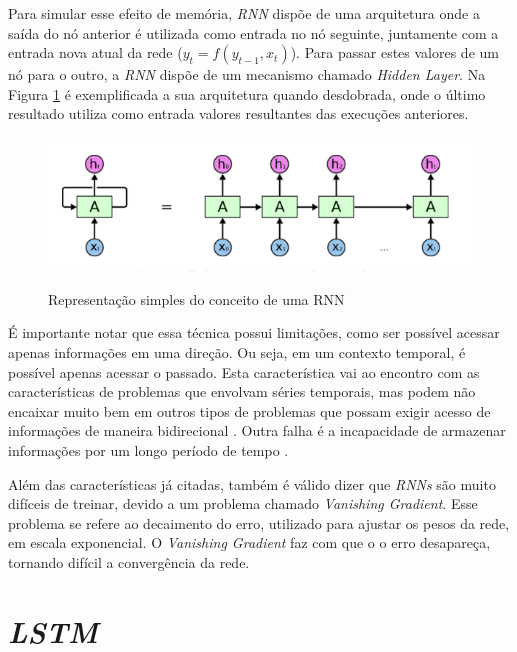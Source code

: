 Para simular esse efeito de memória, \textit{\acrshort{RNN}} dispõe de uma arquitetura onde a saída do nó anterior é utilizada como entrada no nó seguinte, juntamente com a entrada nova atual da rede (\(y_t = f(y_{t-1}, x_t)\)). Para passar estes valores de um nó para o outro, a \textit{\acrshort{RNN}} dispõe de um mecanismo chamado \textit{Hidden Layer}. Na Figura \ref{figure:rnn} é exemplificada a sua arquitetura quando desdobrada, onde o último resultado utiliza como entrada valores resultantes das execuções anteriores.

\begin{figure}[htbp]
    \centering
    \includegraphics[scale=0.4]{monography/img/models/rnnExample.png}
    \label{figure:rnn}
    \caption[Representação simples do conceito de um RNN]{Representação simples do conceito de uma RNN \footnotemark}
\end{figure}

É importante notar que essa técnica possui limitações, como ser possível acessar apenas informações em uma direção. Ou seja, em um contexto temporal, é possível apenas acessar o passado. Esta característica vai ao encontro com as características de problemas que envolvam séries temporais, mas podem não encaixar muito bem em outros tipos de problemas que possam exigir acesso de informações de maneira bidirecional \cite{alex2012}. Outra falha é a incapacidade de armazenar informações por um longo período de tempo \cite{hochreiter2001gradient}. 

Além das características já citadas, também é válido dizer que \textit{\acrshort{RNN}s} são muito difíceis de treinar, devido a um problema chamado \textit{Vanishing Gradient}. Esse problema se refere ao decaimento do erro, utilizado para ajustar os pesos da rede, em escala exponencial. O \textit{Vanishing Gradient} faz com que o o erro desapareça, tornando difícil a convergência da rede. \cite{doi:10.1162/neco.1997.9.8.1735}

\section{\textit{\acrfull{LSTM}}}

